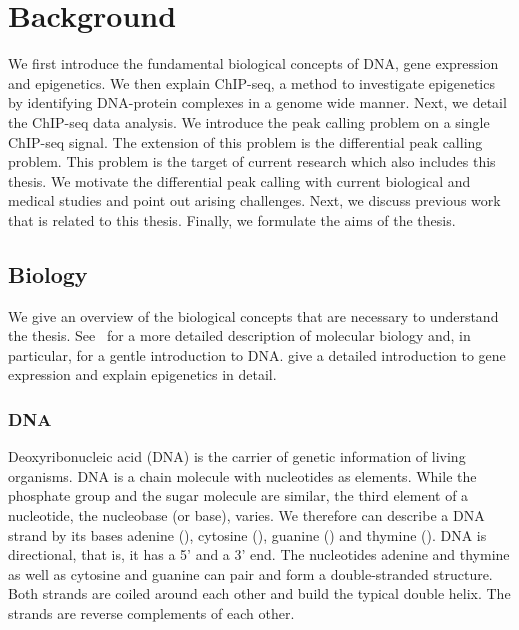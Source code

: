 \chapter{Background}
\label{chapter_background}
We first introduce the fundamental biological concepts of DNA, gene expression and epigenetics. 
We then explain ChIP-seq, a method to investigate epigenetics by identifying DNA-protein complexes in a genome wide manner.
Next, we detail the ChIP-seq data analysis.
We introduce the peak calling problem on a single ChIP-seq signal.
The extension of this problem is the differential peak calling problem.
This problem is the target of current research which also includes this thesis.
We motivate the differential peak calling with current biological and medical studies and point out arising challenges.
Next, we discuss previous work that is related to this thesis.
Finally, we formulate the aims of the thesis.

\section{Biology}
We give an overview of the biological concepts that are necessary to understand the thesis.
See~\cite{Alberts2002} for a more detailed description of molecular biology and, in particular, for a gentle introduction to DNA. 
\cite{Lodish2007} give a detailed introduction to gene expression and \cite{Allis2007} explain epigenetics in detail.

\subsection{DNA}
Deoxyribonucleic acid (DNA) is the carrier of genetic information of living organisms.
DNA is a chain molecule with nucleotides as elements.
While the phosphate group and the sugar molecule are similar, the third element of a nucleotide, the nucleobase (or base), varies.
We therefore can describe a DNA strand by its bases adenine (), cytosine (), guanine () and thymine ().
DNA is directional, that is, it has a 5' and a 3' end.
The nucleotides adenine and thymine as well as cytosine and guanine can pair and form a double-stranded structure.
Both strands are coiled around each other and build the typical double helix.
The strands are reverse complements of each other.


